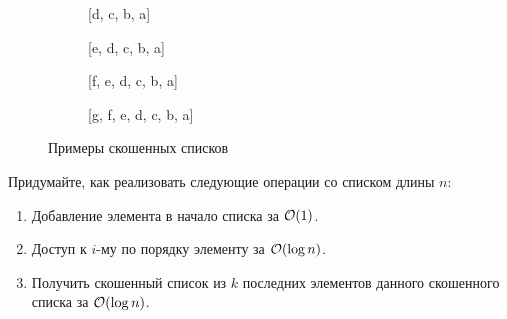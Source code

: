 \begin{enumerate}
\begin{figure}[H]
\begin{subfigure}[b]{0.2\textwidth}
\begin{tikzpicture}
        \end{tikzpicture}
        \caption{[d, c, b, a]}
      \end{subfigure}
      \vfill
      \begin{subfigure}[b]{0.3\textwidth}
        \centering
        \caption{[e, d, c, b, a]}
      \end{subfigure}
      \hfill
      \begin{subfigure}[b]{0.3\textwidth}
        \centering
        \caption{[f, e, d, c, b, a]}
      \end{subfigure}
      \hfill
      \begin{subfigure}[b]{0.3\textwidth}
        \centering
        \caption{[g, f, e, d, c, b, a]}
      \end{subfigure}
      \caption{Примеры скошенных списков}
    \end{figure}

    Придумайте, как реализовать следующие операции со списком длины
    $n$:
    \begin{enumerate}
      \item Добавление элемента в начало списка за $\O(1)$.
      \item Доступ к $i$-му по порядку элементу за $\O(\log{n})$.
      \item Получить скошенный список из $k$ последних элементов данного скошенного списка за $\O(\log{n})$.
    \end{enumerate}


\end{enumerate}
